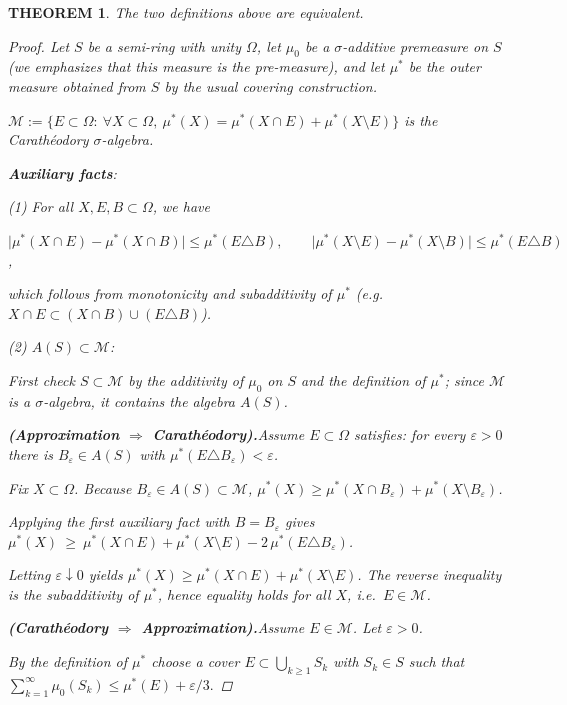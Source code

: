\documentclass[12pt]{article}
\theoremstyle{blueplain}
\newtheorem{theorem}{THEOREM}[section]
\theoremstyle{bluedef}
\theoremstyle{blueremark}
\numberwithin{equation}{section}
\begin{document}
\begin{theorem}
  The two definitions above are equivalent.
  \begin{proof}
    Let $S$ be a semi-ring with unity $\Omega$, let $\mu_0$ be a $\sigma$-additive premeasure on $S$ (we emphasizes that this measure is the pre-measure), and let $\mu^*$ be the outer measure obtained from $S$ by the usual covering construction.

    \(\mathcal M:=\Big\{E\subset\Omega:\ \forall X\subset\Omega,\ \mu^*(X)=\mu^*(X\cap E)+\mu^*(X\setminus E)\Big\}\) is the Carath\'eodory $\sigma$-algebra.

    \noindent\textbf{Auxiliary facts}:

    (1) For all $X,E,B\subset\Omega$, we have

    $\big|\mu^*(X\cap E)-\mu^*(X\cap B)\big|\le \mu^*(E\triangle B),\qquad \big|\mu^*(X\setminus E)-\mu^*(X\setminus B)\big|\le \mu^*(E\triangle B)$,

    which follows from monotonicity and subadditivity of $\mu^*$ (e.g.\ $X\cap E\subset (X\cap B)\cup(E\triangle B)$).

    (2) $A(S)\subset\mathcal M$:

    First check $S\subset\mathcal M$ by the additivity of $\mu_0$ on $S$ and the definition of $\mu^*$; since $\mathcal M$ is a $\sigma$-algebra, it contains the algebra $A(S)$.

    \noindent\textbf{(Approximation $\Rightarrow$ Carath\'eodory).}Assume $E\subset\Omega$ satisfies: for every $\varepsilon>0$ there is $B_\varepsilon\in A(S)$ with $\mu^*(E\triangle B_\varepsilon)<\varepsilon$.

    Fix $X\subset\Omega$. Because $B_\varepsilon\in A(S)\subset\mathcal M$, \(\mu^*(X)\ge \mu^*(X\cap B_\varepsilon)+\mu^*(X\setminus B_\varepsilon)\).

    Applying the first auxiliary fact with $B=B_\varepsilon$ gives \(\mu^*(X)\ \ge\ \mu^*(X\cap E)+\mu^*(X\setminus E)-2\,\mu^*(E\triangle B_\varepsilon)\).

    Letting $\varepsilon\downarrow0$ yields $\mu^*(X)\ge \mu^*(X\cap E)+\mu^*(X\setminus E)$. The reverse inequality is the subadditivity of $\mu^*$, hence equality holds for all $X$, i.e.\ $E\in\mathcal M$.

    \noindent\textbf{(Carath\'eodory $\Rightarrow$ Approximation).}Assume $E\in\mathcal M$. Let $\varepsilon>0$.

    By the definition of $\mu^*$ choose a cover $E\subset\bigcup_{k\ge1} S_k$ with $S_k\in S$ such that \(\sum_{k=1}^\infty \mu_0(S_k)\le \mu^*(E)+\varepsilon/3.\)


\end{proof}
\end{theorem}
\end{document}
